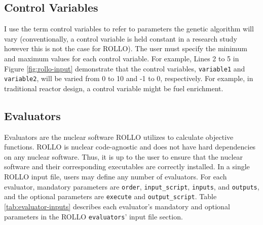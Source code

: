\subsection{Control Variables}
I use the term control variables to refer to parameters the genetic algorithm will 
vary (conventionally, a control variable is held constant in a research study 
however this is not the case for \gls{ROLLO}).
The user must specify the minimum and maximum values for each control variable.
For example, Lines 2 to 5 in Figure \ref{fig:rollo-input} demonstrate that the 
control variables, \texttt{variable1} and \texttt{variable2}, 
will be varied from 0 to 10 and -1 to 0, respectively. 
For example, in traditional reactor design, a control variable might be fuel 
enrichment. 

\subsection{Evaluators}
Evaluators are the nuclear software \gls{ROLLO} utilizes to calculate objective functions. 
\gls{ROLLO} is nuclear code-agnostic and does not have hard dependencies on any 
nuclear software.
Thus, it is up to the user to ensure that the nuclear software and their corresponding 
executables are correctly installed. 
In a single \gls{ROLLO} input file, users may define any number of evaluators. 
For each evaluator, mandatory parameters are \texttt{order}, \texttt{input\_script}, 
\texttt{inputs}, and \texttt{outputs}, and the optional parameters are
\texttt{execute} and \texttt{output\_script}. 
Table \ref{tab:evaluator-inputs} describes each evaluator's mandatory and optional parameters 
in the \gls{ROLLO} \texttt{evaluators}' input file section.  
